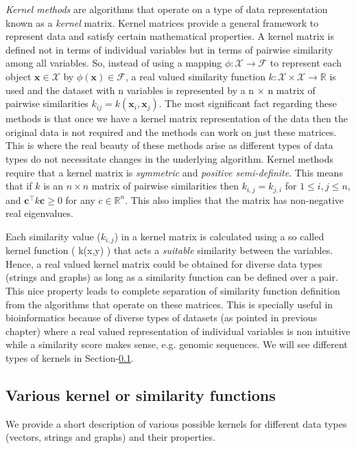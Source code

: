 \textit{Kernel methods} are algorithms that operate on a type of data representation known as a \textit{kernel} matrix. Kernel matrices provide a general framework to represent data and satisfy certain mathematical properties. A kernel matrix is defined not in terms of individual variables but in terms of pairwise similarity among all variables. So, instead of using a mapping $\phi:\mathcal{X}\rightarrow\mathcal{F}$ to represent each object $\mathbf{x}\in\mathcal{X}$ by $\phi(\mathbf{x})\in \mathcal{F}$, a real valued similarity function $k:\mathcal{X} \times\mathcal{X}\rightarrow\mathbb{R}$  is used and the dataset with n variables is represented by a n $\times$ n matrix of pairwise similarities $k_{ij}=k(\mathbf{x}_{i},\mathbf{x}_{j})$. The most significant fact regarding these methods is that once we have a kernel matrix representation of the data then the original data is not required and the methods can work on just these matrices. This is where the real beauty of these methods arise as different types of data types do not necessitate changes in the underlying algorithm. Kernel methods require that a kernel matrix is \textit{symmetric} and \textit{positive semi-definite}. This means that if $k$ is an $n \times n$ matrix of pairwise similarities then $k_{i,j}=k_{j,i}$ for $1 \leq i,j \leq n$, and $\mathbf{c}^\top k \mathbf{c} \geq 0$ for any $c \in \mathbb{R}^{n}$. This also implies that the matrix has non-negative real eigenvalues. 

Each similarity value ($k_{i,j}$) in a kernel matrix is calculated using a so called kernel function ( k(x,y) ) that acts a \textit{suitable} similarity between the variables. Hence, a real valued kernel matrix could be obtained for diverse data types (strings and graphs) as long as a similarity function can be defined over a pair. This nice property leads to complete separation of similarity function definition from the algorithms that operate on these matrices. This is specially useful in bioinformatics because of diverse types of datasets (as pointed in previous chapter) where a real valued representation of individual variables is non intuitive while a similarity score makes sense, e.g. genomic sequences. We will see different types of kernels in Section-\ref{kern_types}. 

\subsection{Various kernel or similarity functions}\label{kern_types}
We provide a short description of various possible kernels for different data types (vectors, strings and graphs) and their properties.

